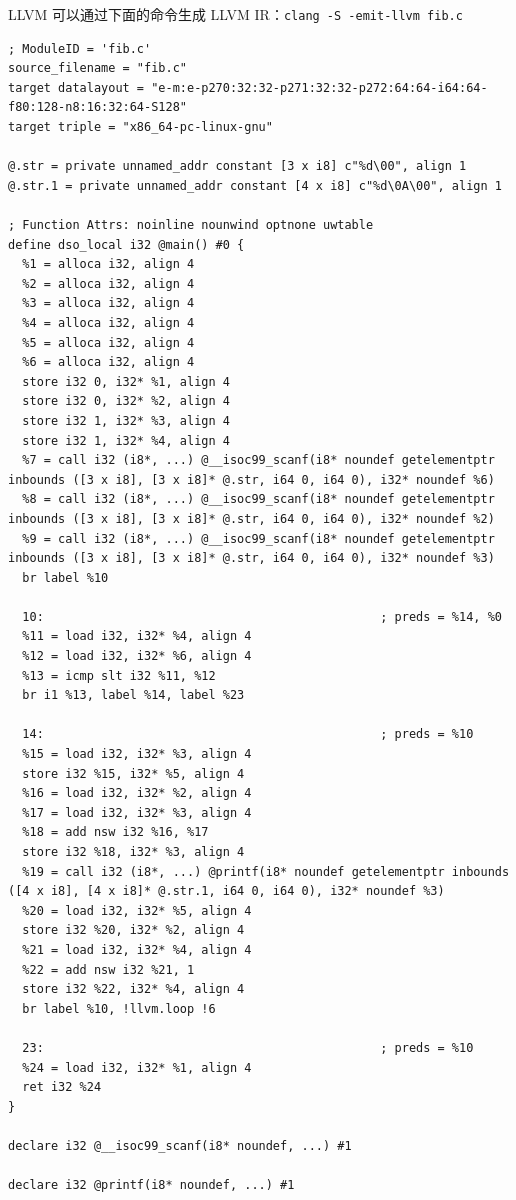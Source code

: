 \documentclass[UTF8,a4paper,10pt]{ctexart}
\begin{document}
LLVM 可以通过下面的命令生成 LLVM IR：\verb|clang -S -emit-llvm fib.c|
\begin{verbatim}
; ModuleID = 'fib.c'
source_filename = "fib.c"
target datalayout = "e-m:e-p270:32:32-p271:32:32-p272:64:64-i64:64-f80:128-n8:16:32:64-S128"
target triple = "x86_64-pc-linux-gnu"

@.str = private unnamed_addr constant [3 x i8] c"%d\00", align 1
@.str.1 = private unnamed_addr constant [4 x i8] c"%d\0A\00", align 1

; Function Attrs: noinline nounwind optnone uwtable
define dso_local i32 @main() #0 {
  %1 = alloca i32, align 4
  %2 = alloca i32, align 4
  %3 = alloca i32, align 4
  %4 = alloca i32, align 4
  %5 = alloca i32, align 4
  %6 = alloca i32, align 4
  store i32 0, i32* %1, align 4
  store i32 0, i32* %2, align 4
  store i32 1, i32* %3, align 4
  store i32 1, i32* %4, align 4
  %7 = call i32 (i8*, ...) @__isoc99_scanf(i8* noundef getelementptr inbounds ([3 x i8], [3 x i8]* @.str, i64 0, i64 0), i32* noundef %6)
  %8 = call i32 (i8*, ...) @__isoc99_scanf(i8* noundef getelementptr inbounds ([3 x i8], [3 x i8]* @.str, i64 0, i64 0), i32* noundef %2)
  %9 = call i32 (i8*, ...) @__isoc99_scanf(i8* noundef getelementptr inbounds ([3 x i8], [3 x i8]* @.str, i64 0, i64 0), i32* noundef %3)
  br label %10

  10:                                               ; preds = %14, %0
  %11 = load i32, i32* %4, align 4
  %12 = load i32, i32* %6, align 4
  %13 = icmp slt i32 %11, %12
  br i1 %13, label %14, label %23

  14:                                               ; preds = %10
  %15 = load i32, i32* %3, align 4
  store i32 %15, i32* %5, align 4
  %16 = load i32, i32* %2, align 4
  %17 = load i32, i32* %3, align 4
  %18 = add nsw i32 %16, %17
  store i32 %18, i32* %3, align 4
  %19 = call i32 (i8*, ...) @printf(i8* noundef getelementptr inbounds ([4 x i8], [4 x i8]* @.str.1, i64 0, i64 0), i32* noundef %3)
  %20 = load i32, i32* %5, align 4
  store i32 %20, i32* %2, align 4
  %21 = load i32, i32* %4, align 4
  %22 = add nsw i32 %21, 1
  store i32 %22, i32* %4, align 4
  br label %10, !llvm.loop !6

  23:                                               ; preds = %10
  %24 = load i32, i32* %1, align 4
  ret i32 %24
}

declare i32 @__isoc99_scanf(i8* noundef, ...) #1

declare i32 @printf(i8* noundef, ...) #1


\end{verbatim}
\end{document}
